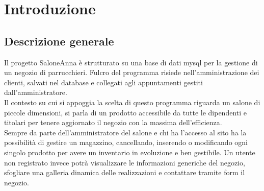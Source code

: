 \documentclass[12pt,a4paper,titlepage]{article}
\begin{document}
	
	
	\clearpage %
	

\chead{}
\cfoot{}
\rfoot{\thepage}
\renewcommand{\headrulewidth}{0.2pt}
\renewcommand{\footrulewidth}{0.2pt}


\tableofcontents
\thispagestyle{empty}

\newpage


\section{Introduzione}
	\subsection{Descrizione generale}
	Il progetto SaloneAnna è strutturato su una base di dati mysql per la gestione di un negozio di parrucchieri. Fulcro del programma risiede nell'amministrazione dei clienti, salvati nel database e collegati agli appuntamenti gestiti dall'amministratore.\\
	Il contesto su cui si appoggia la scelta di questo programma riguarda un salone di piccole dimensioni, si parla di un prodotto accessibile da tutte le dipendenti e titolari per tenere aggiornato il negozio con la massima dell'efficienza.\\
	Sempre da parte dell'amministratore del salone e chi ha l'accesso al sito ha la possibilità di gestire un magazzino, cancellando, inserendo o modificando ogni singolo prodotto per avere un inventario in evoluzione e ben gestibile. Un utente non registrato invece potrà visualizzare le informazioni generiche del negozio, sfogliare una galleria dinamica delle realizzazioni e contattare tramite form il negozio.\\
\end{document}
